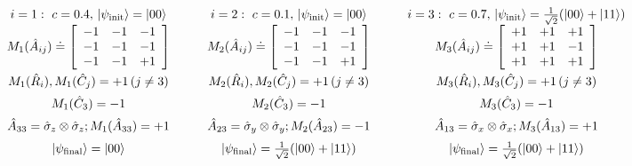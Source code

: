\documentclass[doublecol,british]{epl2}
\theoremstyle{plain}
\theoremstyle{plain}
\theoremstyle{definition}
\theoremstyle{remark}
\theoremstyle{remark}
\theoremstyle{remark}
\theoremstyle{plain}
\theoremstyle{plain}
\theoremstyle{plain}
\theoremstyle{definition}
\theoremstyle{definition}
\begin{document}
\begin{table}
 \begin{equation*}
\renewcommand{\arraystretch}{1.5}
\begin{array}{ccc} 
i=1:\,\, c=0.4,\,\left|\psi_{\text{init}}\right\rangle=\left|00\right\rangle
&
i=2:\,\, c=0.1,\,\left|\psi_{\text{init}}\right\rangle=\left|00\right\rangle
&
i=3:\,\, c=0.7,\,\left|\psi_{\text{init}}\right\rangle=\frac{1}{\sqrt{2}}
(\left|00\right\rangle
+\left|11\right\rangle) \\
\renewcommand{\arraystretch}{1}
M_{1}(\hat{A}_{ij})\doteq\left[\begin{array}{ccc} -1 & -1 & -1\\ -1 & -1 & -1\\ -1 & -1 & +1\end{array}\right] &
\renewcommand{\arraystretch}{1}
M_{2}(\hat{A}_{ij})\doteq\left[\begin{array}{ccc}-1 & -1 & -1\\ -1 & -1 & -1\\ -1 & -1 & +1\end{array}\right] &
\renewcommand{\arraystretch}{1}
M_{3}(\hat{A}_{ij})\doteq\left[\begin{array}{ccc}+1
& +1 & +1\\ +1 & +1 & -1\\ +1 & +1 &
+1\end{array}\right] \\
M_{1}(\hat{R}_{i}), M_{1}(\hat{C}_{j})=+1\,(j\neq3) &
M_{2}(\hat{R}_{i}), M_{2}(\hat{C}_{j})=+1\,(j\neq3) &
M_{3}(\hat{R}_{i}), M_{3}(\hat{C}_{j})=+1\,(j\neq3)\\
M_{1}(\hat{C}_{3})=-1 & M_{2}(\hat{C}_{3})=-1 & M_{3}(\hat{C}_{3})=-1\\ 
\hat{A}_{33}=\hat{\sigma}_{z}\otimes\hat{\sigma}_{z};M_{1}(\hat{A}_{33})=+1&
\quad\quad\hat{A}_{23}=\hat{\sigma}_{y}\otimes\hat{\sigma}_{y};M_{2}(\hat{A}_{23})=-1\quad\quad&
\hat{A}_{13}=\hat{\sigma}_{x}\otimes\hat{\sigma}_{x};M_{3}(\hat{A}_{13})=+1\\
\left|\psi_{\text{final}}\right\rangle =
\left|00\right\rangle  &
\left|\psi_{\text{final}}\right\rangle =
\frac{1}{\sqrt{2}}(\left|00\right\rangle
+\left|11\right\rangle) &
\left|\psi_{\text{final}}\right\rangle =
\frac{1}{\sqrt{2}}(\left|00\right\rangle+\left|11\right\rangle)


\end{array}
\end{equation*}
\end{table}
\end{document}
